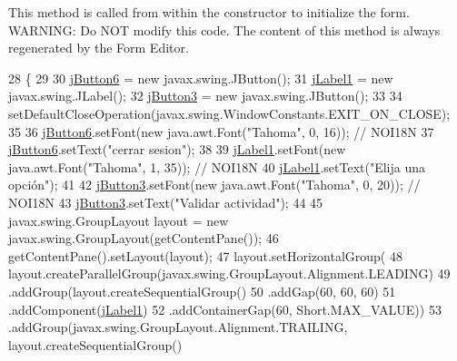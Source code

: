 This method is called from within the constructor to initialize the form. W\+A\+R\+N\+I\+NG\+: Do N\+OT modify this code. The content of this method is always regenerated by the Form Editor. 
\begin{DoxyCode}
28                                   \{
29 
30         \mbox{\hyperlink{classsoftware_1_1opcionesdepval_a97d4a64ac0d9874db69d6b48536e4f1b}{jButton6}} = \textcolor{keyword}{new} javax.swing.JButton();
31         \mbox{\hyperlink{classsoftware_1_1opcionesdepval_ad50e625a5217f436e4271ad010531c99}{jLabel1}} = \textcolor{keyword}{new} javax.swing.JLabel();
32         \mbox{\hyperlink{classsoftware_1_1opcionesdepval_a402a2f2b03d2cec3d84c627cb5c3e7e1}{jButton3}} = \textcolor{keyword}{new} javax.swing.JButton();
33 
34         setDefaultCloseOperation(javax.swing.WindowConstants.EXIT\_ON\_CLOSE);
35 
36         \mbox{\hyperlink{classsoftware_1_1opcionesdepval_a97d4a64ac0d9874db69d6b48536e4f1b}{jButton6}}.setFont(\textcolor{keyword}{new} java.awt.Font(\textcolor{stringliteral}{"Tahoma"}, 0, 16)); \textcolor{comment}{// NOI18N}
37         \mbox{\hyperlink{classsoftware_1_1opcionesdepval_a97d4a64ac0d9874db69d6b48536e4f1b}{jButton6}}.setText(\textcolor{stringliteral}{"cerrar sesion"});
38 
39         \mbox{\hyperlink{classsoftware_1_1opcionesdepval_ad50e625a5217f436e4271ad010531c99}{jLabel1}}.setFont(\textcolor{keyword}{new} java.awt.Font(\textcolor{stringliteral}{"Tahoma"}, 1, 35)); \textcolor{comment}{// NOI18N}
40         \mbox{\hyperlink{classsoftware_1_1opcionesdepval_ad50e625a5217f436e4271ad010531c99}{jLabel1}}.setText(\textcolor{stringliteral}{"Elija una opción"});
41 
42         \mbox{\hyperlink{classsoftware_1_1opcionesdepval_a402a2f2b03d2cec3d84c627cb5c3e7e1}{jButton3}}.setFont(\textcolor{keyword}{new} java.awt.Font(\textcolor{stringliteral}{"Tahoma"}, 0, 20)); \textcolor{comment}{// NOI18N}
43         \mbox{\hyperlink{classsoftware_1_1opcionesdepval_a402a2f2b03d2cec3d84c627cb5c3e7e1}{jButton3}}.setText(\textcolor{stringliteral}{"Validar actividad"});
44 
45         javax.swing.GroupLayout layout = \textcolor{keyword}{new} javax.swing.GroupLayout(getContentPane());
46         getContentPane().setLayout(layout);
47         layout.setHorizontalGroup(
48             layout.createParallelGroup(javax.swing.GroupLayout.Alignment.LEADING)
49             .addGroup(layout.createSequentialGroup()
50                 .addGap(60, 60, 60)
51                 .addComponent(\mbox{\hyperlink{classsoftware_1_1opcionesdepval_ad50e625a5217f436e4271ad010531c99}{jLabel1}})
52                 .addContainerGap(60, Short.MAX\_VALUE))
53             .addGroup(javax.swing.GroupLayout.Alignment.TRAILING, layout.createSequentialGroup()

\end{DoxyCode}
